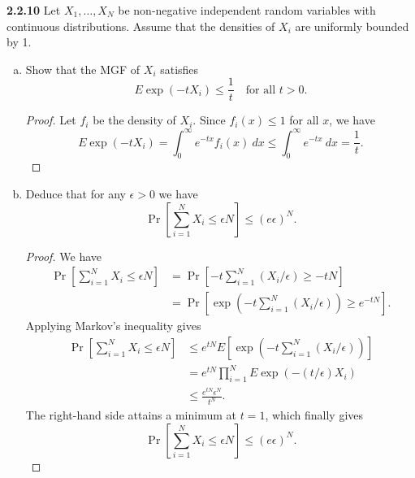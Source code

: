 \documentclass[11pt,letterpaper]{report}
\begin{document}
\noindent\textbf{2.2.10}
Let $X_1, \ldots, X_N$ be non-negative independent random variables with continuous distributions. Assume that the densities of $X_i$ are uniformly bounded by 1.
\begin{enumerate}[(a)]
	\item Show that the MGF of $X_i$ satisfies
	\[
	E\exp(-tX_i)\leq \frac{1}{t}\quad\text{for all }t>0.
	\]
	\begin{proof}
		Let $f_i$ be the density of $X_i$. Since $f_i(x)\leq 1$ for all $x$, we have
		\[
		E\exp(-tX_i) = \int_0^\infty e^{-tx}f_i(x)\ dx \leq \int_0^\infty e^{-tx}\ dx = \frac{1}{t}.
		\]
	\end{proof}

	\item Deduce that for any $\epsilon>0$ we have
	\[
	\Pr\left[\sum_{i=1}^NX_i\leq \epsilon N\right]\leq (e\epsilon)^N.
	\]
	\begin{proof}
		We have
		\begin{align*}
			\Pr\left[\sum_{i=1}^NX_i\leq \epsilon N\right] &= \Pr\left[-t\sum_{i=1}^N(X_i/\epsilon)\geq -tN\right]\\
			&= \Pr\left[\exp\left(-t\sum_{i=1}^N(X_i/\epsilon)\right)\geq e^{-tN}\right].
		\end{align*}
		Applying Markov's inequality gives
		\begin{align*}
			\Pr\left[\sum_{i=1}^NX_i\leq \epsilon N\right] &\leq e^{tN}E\left[\exp\left(-t\sum_{i=1}^N(X_i/\epsilon)\right)\right]\\
			&= e^{tN}\prod_{i=1}^NE\exp(-(t/\epsilon)X_i)\\
			&\leq \frac{e^{tN}\epsilon^N}{t^N}.
		\end{align*}
		The right-hand side attains a minimum at $t=1$, which finally gives
		\[
		\Pr\left[\sum_{i=1}^NX_i\leq \epsilon N\right]\leq (e\epsilon)^N.
		\]
	\end{proof}
\end{enumerate}
\end{document}
